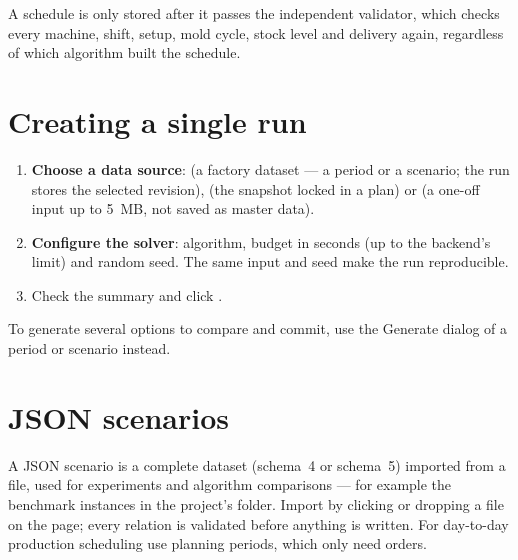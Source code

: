 \begin{note}
A schedule is only stored after it passes the independent validator, which checks every machine, shift,
setup, mold cycle, stock level and delivery again, regardless of which algorithm built the schedule.
\end{note}

\section{Creating a single run}\label{sec:single-run}


\begin{enumerate}
  \item \textbf{Choose a data source}:  (a factory dataset --- a period or a scenario; the run stores
        the selected revision),  (the snapshot locked in a plan) or  (a
        one-off input up to 5~MB, not saved as master data).
  \item \textbf{Configure the solver}: algorithm, budget in seconds (up to the backend's limit) and random
        seed. The same input and seed make the run reproducible.
  \item Check the summary and click .
\end{enumerate}

To generate several options to compare and commit, use the Generate dialog of a period or scenario instead.

\section{JSON scenarios}


A JSON scenario is a complete dataset (schema~4 or schema~5) imported from a file, used for experiments and
algorithm comparisons --- for example the benchmark instances in the project's  folder. Import by
clicking  or dropping a file on the page; every relation is validated before anything is
written. For day-to-day production scheduling use planning periods, which only need orders.


